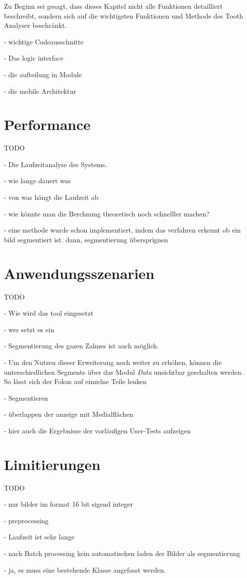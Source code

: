 Zu Beginn sei gesagt, dass dieses Kapitel nicht alle Funktionen detailliert beschreibt,
sondern sich auf die wichtigsten Funktionen und Methode des Tooth Analyser
beschränkt.

- wichtige Codeausschnitte

- Das logic interface

- die aufteilung in Module

- die mobile Architektur

\section{Performance}
TODO

- Die Laufzeitanalyse des Systems.

- wie lange dauert was

- von was hängt die Laufzeit ab

- wie könnte man die Berchnung theoretisch noch schnelller machen?

- eine methode wurde schon implementiert, indem das verfahren erkennt ob ein
bild segmentiert ist. dann, segmentierung übersprignen

\section{Anwendungsszenarien}
TODO

- Wie wird das tool eingesetzt

- wer setzt es ein

- Segmentierung des gazen Zahnes ist auch möglich.

- Um den Nutzen dieser Erweiterung noch weiter zu erhöhen, können die unterschiedlichen
Segmente über das Modul \textit{Data} unsichtbar geschalten werden. So lässt sich
der Fokus auf einzelne Teile lenken

- Segmentieren

- überlappen der anzeige mit Medialflächen

- hier auch die Ergebnisse der vorläufigen User-Tests aufzeigen


\section{Limitierungen}
TODO

- nur bilder im format 16 bit sigend integer

- preprocessing

- Laufzeit ist sehr lange

- nach Batch processing kein automatischen laden der Bilder als segmentierung

- ja, es muss eine bestehende Klasse angefasst werden.
